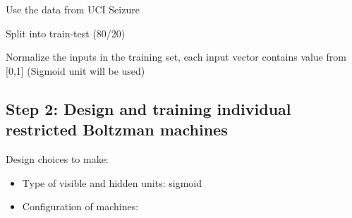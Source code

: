\documentclass[12pt]{article}
\begin{document}
Use the data from UCI Seizure~\cite{UCISeizure}

Split into train-test (80/20)

Normalize the inputs in the training set, each input vector contains value from [0,1] (Sigmoid unit will be used)

\subsection{Step 2: Design and training individual restricted Boltzman machines}

Design choices to make:
\begin{itemize}
\item Type of visible and hidden units: sigmoid
\item Configuration of machines: 
\end{itemize}



\end{document}
